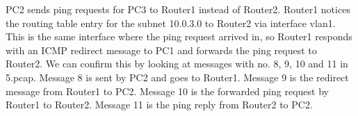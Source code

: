 PC2 sends ping requests for PC3 to Router1 instead of Router2. Router1 notices the routing table entry for the subnet 10.0.3.0 to Router2 via interface vlan1. This is the same interface where the ping request arrived in, so Router1 responds with an ICMP redirect message to PC1 and forwards the ping request to Router2.
We can confirm this by looking at messages with no. 8, 9, 10 and 11 in 5.pcap. 
	Message 8 is sent by PC2 and goes to Router1. 
	Message 9 is the redirect message from Router1 to PC2.
	Message 10 is the forwarded ping request by Router1 to Router2.
	Message 11 is the ping reply from Router2 to PC2.